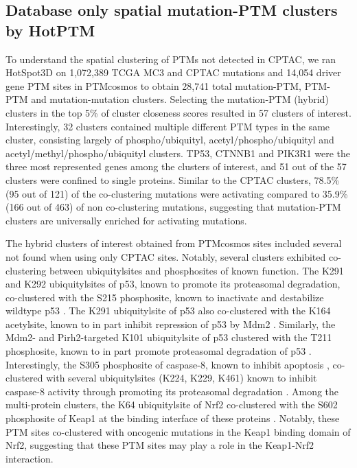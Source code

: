 \subsection{Database only spatial mutation-PTM clusters by HotPTM}
To understand the spatial clustering of PTMs not detected in CPTAC, we ran HotSpot3D on 1,072,389 TCGA MC3 and CPTAC mutations and 14,054 driver gene PTM sites in PTMcosmos to obtain 28,741 total mutation-PTM, PTM-PTM and mutation-mutation clusters. Selecting the mutation-PTM (hybrid) clusters in the top 5\% of cluster closeness scores resulted in 57 clusters of interest. Interestingly, 32 clusters contained multiple different PTM types in the  same cluster, consisting largely of phospho/ubiquityl, acetyl/phospho/ubiquityl and acetyl/methyl/phospho/ubiquityl clusters. TP53, CTNNB1 and PIK3R1 were the three most represented genes among the clusters of interest, and 51 out of the 57 clusters were confined to single proteins. Similar to the CPTAC clusters, 78.5\% (95 out of 121) of the co-clustering mutations were activating compared to 35.9\% (166 out of 463) of non co-clustering mutations, suggesting that mutation-PTM clusters are universally enriched for activating mutations.

The hybrid clusters of interest obtained from PTMcosmos sites included several not found when using only CPTAC sites. Notably, several clusters exhibited co-clustering between ubiquitylsites and phosphosites of known function. The K291 and K292 ubiquitylsites of p53, known to promote its proteasomal degradation, co-clustered with the S215 phosphosite, known to inactivate and destabilize wildtype p53 \cite{fraserja_hupptr:NovelP532010}. The K291 ubiquitylsite of p53 also co-clustered with the K164 acetylsite, known to in part inhibit repression of p53 by Mdm2 \cite{yt_wg:AcetylationIndispensable2008}. Similarly, the Mdm2- and Pirh2-targeted K101 ubiquitylsite of p53 clustered with the T211 phosphosite, known to in part promote proteasomal degradation of p53 \cite{gullycp_leemh:AuroraKinase2012,shloushj_arrowsmithch:StructuralFunctional2011}. Interestingly, the S305 phosphosite of caspase-8, known to inhibit apoptosis \cite{matthessy_strebhardtk:SequentialCdk12014}, co-clustered with several ubiquitylsites (K224, K229, K461) known to inhibit caspase-8 activity through promoting its proteasomal degradation \cite{gonzalvezf_ashkenazia:TRAF2Sets2012}. Among the multi-protein clusters, the K64 ubiquitylsite of Nrf2 co-clustered with the S602 phosphosite of Keap1 at the binding interface of these proteins \cite{cloerew_majormb:NRF2Activation2019}. Notably, these PTM sites co-clustered with oncogenic mutations in the Keap1 binding domain of Nrf2, suggesting that these PTM sites may play a role in the Keap1-Nrf2 interaction.



